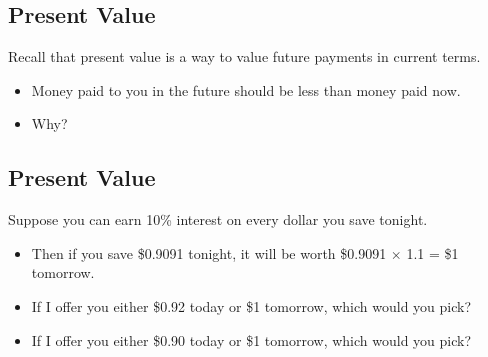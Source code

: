 \documentclass[letterpaper,10pt,english]{sphinxmanual}
\begin{document}
\subsection{Present Value}
\label{assetClasses:id1}
Recall that present value is a way to value future payments in current
terms.
\begin{itemize}
\item {} 
Money paid to you in the future should be less than money paid now.

\end{itemize}
\begin{itemize}
\item {} 
Why?

\end{itemize}


\subsection{Present Value}
\label{assetClasses:id2}
Suppose you can earn 10\% interest on every dollar you save tonight.
\begin{itemize}
\item {} 
Then if you save \$0.9091 tonight, it will be worth
\$0.9091 $\times$ 1.1 = \$1 tomorrow.

\end{itemize}
\begin{itemize}
\item {} 
If I offer you either \$0.92 today or \$1 tomorrow, which would you
pick?

\end{itemize}
\begin{itemize}
\item {} 
If I offer you either \$0.90 today or \$1 tomorrow, which would you
pick?

\end{itemize}
\end{document}
